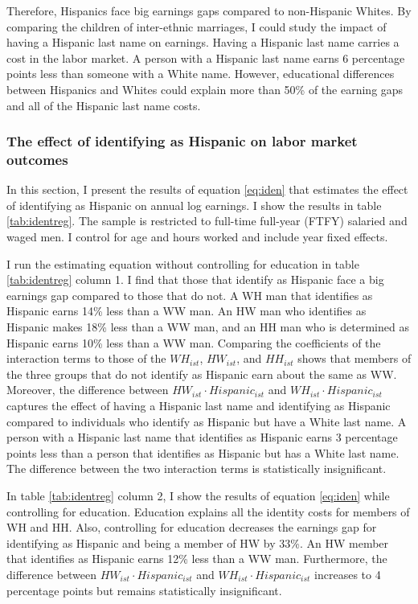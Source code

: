 \documentclass[12pt, fullpage]{article}
\begin{document}
Therefore, Hispanics face big earnings gaps compared to non-Hispanic Whites. By comparing the children of inter-ethnic marriages, I could study the impact of having a Hispanic last name on earnings. Having a Hispanic last name carries a cost in the labor market. A person with a Hispanic last name earns 6 percentage points less than someone with a White name. However, educational differences between Hispanics and Whites could explain more than 50\% of the earning gaps and all of the Hispanic last name costs.

\subsubsection{The effect of identifying as Hispanic on labor market outcomes}

In this section, I present the results of equation \ref{eq:iden} that estimates the effect of identifying as Hispanic on annual log earnings. I show the results in table \ref{tab:identreg}. The sample is restricted to full-time full-year (FTFY) salaried and waged men. I control for age and hours worked and include year fixed effects.

I run the estimating equation without controlling for education in table \ref{tab:identreg} column 1. I find that those that identify as Hispanic face a big earnings gap compared to those that do not. A WH man that identifies as Hispanic earns 14\% less than a WW man. An HW man who identifies as Hispanic makes 18\% less than a WW man, and an HH man who is determined as Hispanic earns 10\% less than a WW man. Comparing the coefficients of the interaction terms to those of the $WH_{ist}$, $HW_{ist}$, and $HH_{ist}$ shows that members of the three groups that do not identify as Hispanic earn about the same as WW.
Moreover, the difference between $HW_{ist} \cdot Hispanic_{ist}$  and $WH_{ist} \cdot Hispanic_{ist}$ captures the effect of having a Hispanic last name and identifying as Hispanic compared to individuals who identify as Hispanic but have a White last name. A person with a Hispanic last name that identifies as Hispanic earns 3 percentage points less than a person that identifies as Hispanic but has a White last name. The difference between the two interaction terms is statistically insignificant.

In table  \ref{tab:identreg} column 2, I show the results of equation \ref{eq:iden} while controlling for education. Education explains all the identity costs for members of WH and HH. Also, controlling for education decreases the earnings gap for identifying as Hispanic and being a member of HW by 33\%. An HW member that identifies as Hispanic earns 12\% less than a WW man. Furthermore, the difference between $HW_{ist} \cdot Hispanic_{ist}$  and $WH_{ist} \cdot Hispanic_{ist}$ increases to 4 percentage points but remains statistically insignificant.
\end{document}
